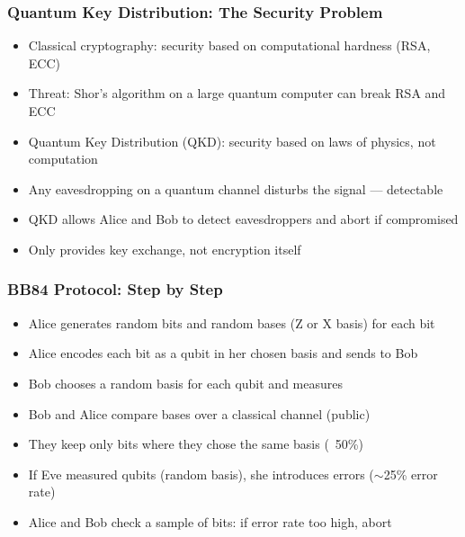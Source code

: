\begin{frame}[fragile]\frametitle{Quantum Key Distribution: The Security Problem}
\begin{itemize}
\item Classical cryptography: security based on computational hardness (RSA, ECC)
\item Threat: Shor's algorithm on a large quantum computer can break RSA and ECC
\item Quantum Key Distribution (QKD): security based on laws of physics, not computation
\item Any eavesdropping on a quantum channel disturbs the signal --- detectable
\item QKD allows Alice and Bob to detect eavesdroppers and abort if compromised
\item Only provides key exchange, not encryption itself
\end{itemize}
\end{frame}

\begin{frame}[fragile]\frametitle{BB84 Protocol: Step by Step}
\begin{itemize}
\item Alice generates random bits and random bases (Z or X basis) for each bit
\item Alice encodes each bit as a qubit in her chosen basis and sends to Bob
\item Bob chooses a random basis for each qubit and measures
\item Bob and Alice compare bases over a classical channel (public)
\item They keep only bits where they chose the same basis (~50\%)
\item If Eve measured qubits (random basis), she introduces errors ($\sim$25\% error rate)
\item Alice and Bob check a sample of bits: if error rate too high, abort
\end{itemize}
\end{frame}

